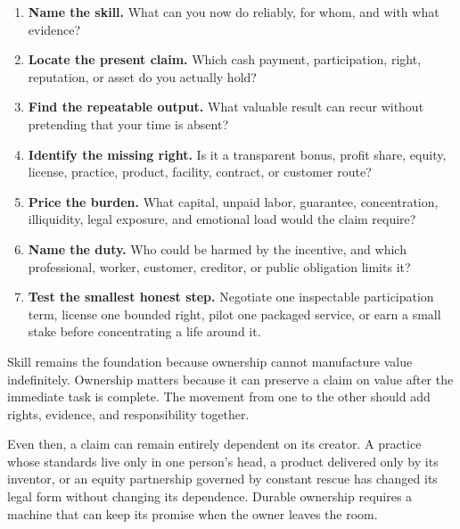 \begin{enumerate}[itemsep=0.12em]
\item \textbf{Name the skill.} What can you now do reliably, for whom, and with
  what evidence?
\item \textbf{Locate the present claim.} Which cash payment, participation,
  right, reputation, or asset do you actually hold?
\item \textbf{Find the repeatable output.} What valuable result can recur
  without pretending that your time is absent?
\item \textbf{Identify the missing right.} Is it a transparent bonus, profit
  share, equity, license, practice, product, facility, contract, or customer
  route?
\item \textbf{Price the burden.} What capital, unpaid labor, guarantee,
  concentration, illiquidity, legal exposure, and emotional load would the
  claim require?
\item \textbf{Name the duty.} Who could be harmed by the incentive, and which
  professional, worker, customer, creditor, or public obligation limits it?
\item \textbf{Test the smallest honest step.} Negotiate one inspectable
  participation term, license one bounded right, pilot one packaged service,
  or earn a small stake before concentrating a life around it.
\end{enumerate}

Skill remains the foundation because ownership cannot manufacture value
indefinitely. Ownership matters because it can preserve a claim on value after
the immediate task is complete. The movement from one to the other should add
rights, evidence, and responsibility together.

Even then, a claim can remain entirely dependent on its creator. A practice
whose standards live only in one person's head, a product delivered only by its
inventor, or an equity partnership governed by constant rescue has changed its
legal form without changing its dependence. Durable ownership requires a
machine that can keep its promise when the owner leaves the room.
